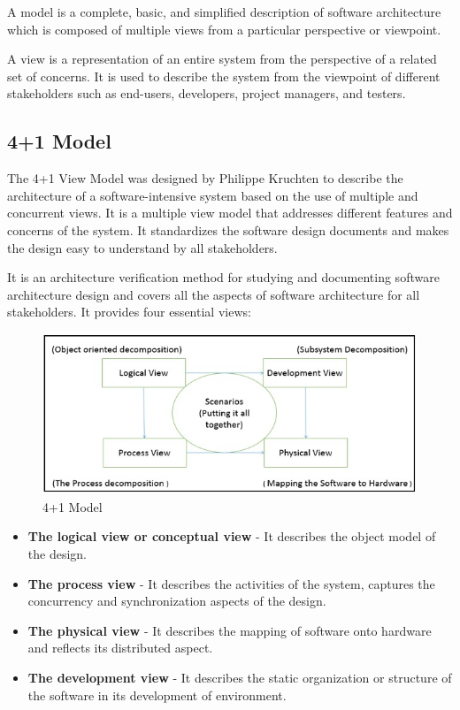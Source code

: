 \documentclass[10pt,oneside]{report}
\begin{document}
A model is a complete, basic, and simplified description of software architecture which is composed of multiple views from a particular perspective or viewpoint.

A view is a representation of an entire system from the perspective of a related set of concerns. It is used to describe the system from the viewpoint of different stakeholders such as end-users, developers, project managers, and testers.


\subsection{4+1 Model}\label{vp:mk}

The 4+1 View Model was designed by Philippe Kruchten to describe the architecture of a software-intensive system based on the use of multiple and concurrent views. It is a multiple view model that addresses different features and concerns of the system. It standardizes the software design documents and makes the design easy to understand by all stakeholders.

It is an architecture verification method for studying and documenting software architecture design and covers all the aspects of software architecture for all stakeholders. It provides four essential views:

\begin{figure}[h!]
\includegraphics[width=15cm]{four-plus-one-view-model.jpg}
\caption{4+1 Model}
\label{Basic Micro-services architecture pattern}
\end{figure}

\begin{itemize}
\item \textbf{The logical view or conceptual view} - It describes the object model of the design.
\item \textbf{The process view} - It describes the activities of the system, captures the concurrency and synchronization aspects of the design.
\item \textbf{The physical view} - It describes the mapping of software onto hardware and reflects its distributed aspect.
\item \textbf{The development view} - It describes the static organization or structure of the software in its development of environment.
\end{itemize}
\end{document}
